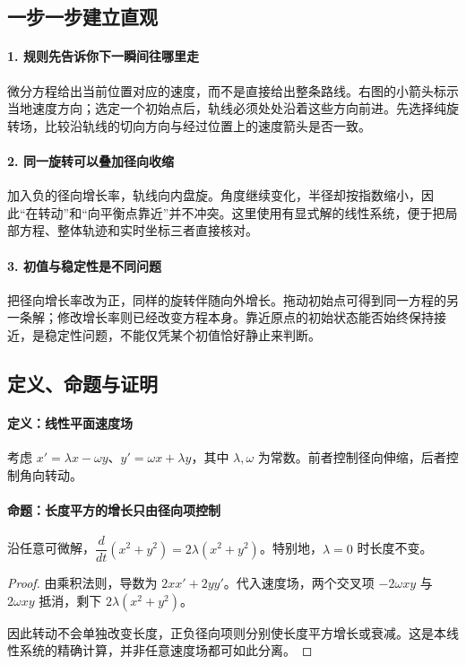 \subsection*{一步一步建立直观}

\paragraph{1. 规则先告诉你下一瞬间往哪里走}

微分方程给出当前位置对应的速度，而不是直接给出整条路线。右图的小箭头标示当地速度方向；选定一个初始点后，轨线必须处处沿着这些方向前进。先选择纯旋转场，比较沿轨线的切向方向与经过位置上的速度箭头是否一致。



\paragraph{2. 同一旋转可以叠加径向收缩}

加入负的径向增长率，轨线向内盘旋。角度继续变化，半径却按指数缩小，因此“在转动”和“向平衡点靠近”并不冲突。这里使用有显式解的线性系统，便于把局部方程、整体轨迹和实时坐标三者直接核对。



\paragraph{3. 初值与稳定性是不同问题}

把径向增长率改为正，同样的旋转伴随向外增长。拖动初始点可得到同一方程的另一条解；修改增长率则已经改变方程本身。靠近原点的初始状态能否始终保持接近，是稳定性问题，不能仅凭某个初值恰好静止来判断。



\subsection*{定义、命题与证明}

\paragraph{定义：线性平面速度场}

考虑 $x'=\lambda x-\omega y$、$y'=\omega x+\lambda y$，其中 $\lambda,\omega$ 为常数。前者控制径向伸缩，后者控制角向转动。

\paragraph{命题：长度平方的增长只由径向项控制}

沿任意可微解，$\dfrac d{dt}(x^2+y^2)=2\lambda(x^2+y^2)$。特别地，$\lambda=0$ 时长度不变。

\begin{proof}

由乘积法则，导数为 $2xx'+2yy'$。代入速度场，两个交叉项 $-2\omega xy$ 与 $2\omega xy$ 抵消，剩下 $2\lambda(x^2+y^2)$。

因此转动不会单独改变长度，正负径向项则分别使长度平方增长或衰减。这是本线性系统的精确计算，并非任意速度场都可如此分离。

\end{proof}

